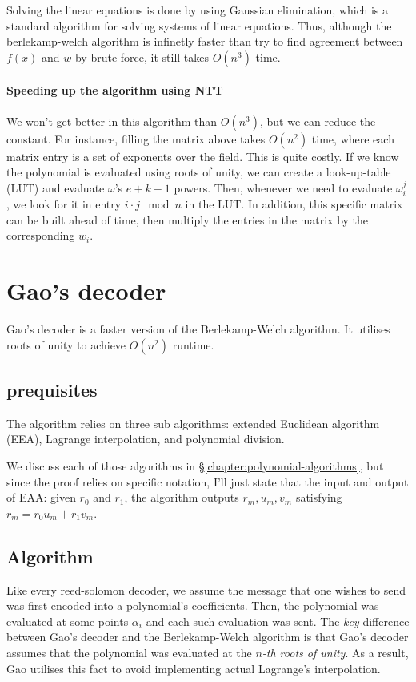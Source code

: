 Solving the linear equations is done by using Gaussian elimination,
which is a standard algorithm for solving systems of linear equations.
Thus, although the berlekamp-welch algorithm is infinetly faster than try to find agreement 
between $f(x)$ and $w$ by brute force, it still takes $O(n^3)$ time. 


\paragraph{Speeding up the algorithm using NTT}
We won't get better in this algorithm than $O(n^3)$, but we can reduce the constant.
For instance, filling the matrix above takes $O(n^2)$ time, where each matrix entry 
is a set of exponents over the field. This is quite costly. 
If we know the polynomial is evaluated using roots of unity, we can 
create a look-up-table (LUT) and evaluate $\omega$'s $e+k-1$ powers. 
Then, whenever we need to evaluate $\omega_i^j$, we look for it in entry $i\cdot j \mod n$ 
in the LUT.
In addition, this specific matrix can be built ahead of time, then multiply the entries in 
the matrix by the corresponding $w_i$. 


\section{Gao's decoder}
Gao's decoder is a faster version of the Berlekamp-Welch algorithm.
It utilises roots of unity to achieve $O(n^2)$ runtime.

\subsection{prequisites}
The algorithm relies on three sub algorithms: extended Euclidean algorithm (EEA),
Lagrange interpolation, and polynomial division.

We discuss each of those algorithms in \S\ref{chapter:polynomial-algorithms}, 
but since the proof relies on specific notation, I'll just state 
that the input and output of EAA: given $r_0$ and $r_1$, the algorithm
outputs $r_m,u_m,v_m$ satisfying $r_m=r_0u_m+r_1v_m$.

\subsection{Algorithm}
Like every reed-solomon decoder, we assume the message that one 
wishes to send was first encoded into a polynomial's coefficients.
Then, the polynomial was evaluated at some points $\alpha_i$ and 
each such evaluation was sent.
The \emph{key} difference between Gao's decoder and the Berlekamp-Welch algorithm
is that Gao's decoder assumes that the polynomial was evaluated at
the \emph{$n$-th roots of unity}.
As a result, Gao utilises this fact to avoid implementing actual Lagrange's interpolation.


